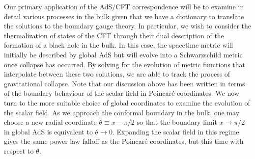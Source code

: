 \documentclass[../PhD.tex]{subfiles}
\begin{document}
Our primary application of the AdS/CFT correspondence will be to examine in detail various processes in the bulk given that we have a dictionary to translate the solutions to the boundary gauge theory. In particular, we wish to consider the thermalization of states of the CFT through their dual description of the formation of a black hole in the bulk. In this case, the spacetime metric will initially be described by global AdS but will evolve into a Schwarzschild metric once collapse has occurred. By solving for the evolution of metric functions that interpolate between these two solutions, we are able to track the process of gravitational collapse. Note that our discussion above has been written in terms of the boundary behaviour of the scalar field in Poincar\'e coordinates. We now turn to the more suitable choice of global coordinates to examine the evolution of the scalar field. As we approach the conformal boundary in the bulk, one may choose a new radial coordinate $\theta \equiv x - \pi/2$ so that the boundary limit $x \to \pi/2$ in global AdS is equivalent to $\theta \to 0$. Expanding the scalar field in this regime gives the same power law falloff as the Poincar\'e coordinates, but this time with respect to $\theta$.
\end{document}
